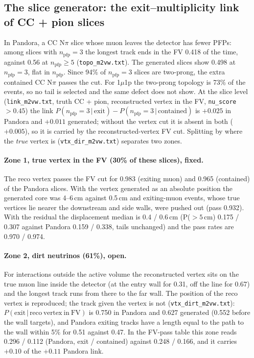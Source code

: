 \documentclass[11pt]{article}
\newcommand{\real}{Pandora}
\begin{document}
\subsection{The slice generator: the exit--multiplicity link of CC + pion slices}
\label{sec:link}

In \real{}, a CC N$\pi$ slice whose muon leaves the detector has fewer PFPs: among slices with
$n_\mathrm{pfp}=3$ the longest track ends in the FV 0.418 of the time, against 0.56 at $n_\mathrm{pfp}\ge5$
(\texttt{topo\_m2vw.txt}). The generated slices show 0.498 at $n_\mathrm{pfp}=3$, flat in $n_\mathrm{pfp}$.
Since 94\% of $n_\mathrm{pfp}=3$ slices are two-prong, the extra contained CC N$\pi$ passes the cut. For
1$\mu$1p the two-prong topology is 73\% of the events, so no tail is selected and the same defect does not show.
At the slice level (\texttt{link\_m2vw.txt}, truth CC + pion, reconstructed vertex in the FV,
\texttt{nu\_score}$>0.45$) the link $P(n_\mathrm{pfp}=3\,|\,\mathrm{exit}) - P(n_\mathrm{pfp}=3\,|\,\mathrm{contained})$
is $+0.025$ in \real{} and $+0.011$ generated; without the vertex cut it is absent in both ($+0.005$), so it is
carried by the reconstructed-vertex FV cut. Splitting by where the \emph{true} vertex is
(\texttt{vtx\_dir\_m2vw.txt}) separates two zones.

\paragraph{Zone 1, true vertex in the FV (30\% of these slices), fixed.} The reco vertex passes the FV cut for
0.983 (exiting muon) and 0.965 (contained) of the \real{} slices. With the vertex generated as an absolute
position the generated core was 4--6\,cm against 0.5\,cm and exiting-muon events, whose true vertices lie nearer
the downstream and side walls, were pushed out (pass 0.932). With the residual the displacement median is
0.4 / 0.6\,cm (P($>5$\,cm) 0.175 / 0.307 against \real{} 0.159 / 0.338, tails unchanged) and the pass rates are
0.970 / 0.974.

\paragraph{Zone 2, dirt neutrinos (61\%), open.} For interactions outside the active volume the reconstructed
vertex sits on the true muon line inside the detector (at the entry wall for 0.31, off the line for 0.67) and the
longest track runs from there to the far wall. The position of the reco vertex is reproduced; the track given
the vertex is not (\texttt{vtx\_dirt\_m2vw.txt}): $P(\mathrm{exit}\,|\,\mathrm{reco\ vertex\ in\ FV})$ is 0.750
in \real{} and 0.627 generated (0.552 before the wall targets), and \real{} exiting tracks have a length equal to
the path to the wall within 5\% for 0.51 against 0.47. In the FV-pass table this zone reads 0.296 / 0.112
(\real{}, exit / contained) against 0.248 / 0.166, and it carries $+0.10$ of the $+0.11$ \real{} link.
\end{document}
